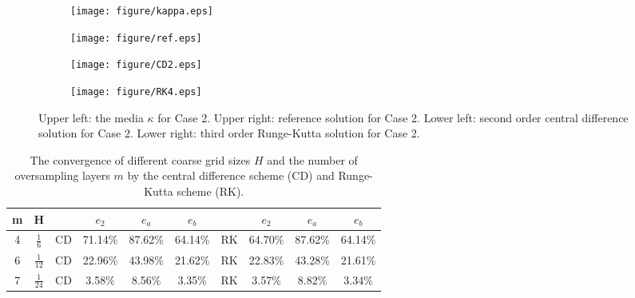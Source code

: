 \documentclass[preprint,12pt]{elsarticle}
\begin{document}
\begin{figure}[H]
    \centering
    \begin{subfigure}[b]{0.37\textwidth}
        \texttt{[image: figure/kappa.eps]}
        \caption{}
        \label{fig:image01}
    \end{subfigure}
    \begin{subfigure}[b]{0.37\textwidth}
        \texttt{[image: figure/ref.eps]}
        \caption{}
        \label{fig:image02}
    \end{subfigure}

    \begin{subfigure}[b]{0.37\textwidth}
        \texttt{[image: figure/CD2.eps]}
        \caption{}
        \label{fig:image03}
    \end{subfigure}
    \begin{subfigure}[b]{0.37\textwidth}
        \texttt{[image: figure/RK4.eps]}
        \caption{}
        \label{fig:image04}
    \end{subfigure}
    \caption{Upper left: the media $\kappa$ for Case 2. Upper right: reference solution for Case 2. Lower left: second order central difference solution for Case 2. Lower right: third order Runge-Kutta solution for Case 2.}
    \label{fig:k}
\end{figure}
\begin{table}[H]
\centering
\begin{tabular}{c c| c|c c c |c |c c c}
m &H&~& $e_2$&$e_a$&$e_b$&~& $e_2$&$e_a$&$e_b$ \\
\hline
4&$\frac{1}{6}$ &CD&71.14\% & 87.62\%&64.14\% &RK&64.70\%&87.62\%&64.14\%\\
\hline
6&$\frac{1}{12}$ &CD&22.96\% &43.98\%&21.62\%&RK&22.83\%&43.28\%&21.61\%\\
\hline
7& $\frac{1}{24}$ &CD& 3.58\%&8.56\% &3.35\%&RK&3.57\%&8.82\%&3.34\%\\
\hline
\end{tabular}
\caption{The convergence of different coarse grid sizes $H$ and the number of oversampling layers $m$ by the central difference scheme (CD) and Runge-Kutta scheme (RK).}
 \label{tableH}
\end{table} 
\end{document}

